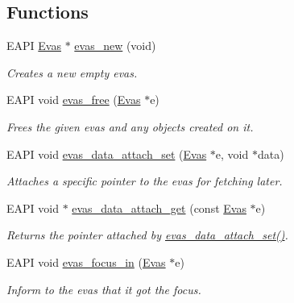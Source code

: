 \subsection*{Functions}
\begin{DoxyCompactItemize}
\item 
EAPI \hyperlink{group__Evas__Canvas_ga5ff87cc4ce6bc43e3b640a6d37f73043}{Evas} $\ast$ \hyperlink{group__Evas__Canvas_ga9280ee6564c889348b142b8bcd723f87}{evas\_\-new} (void)
\begin{DoxyCompactList}\small\item\em Creates a new empty evas. \item\end{DoxyCompactList}\item 
EAPI void \hyperlink{group__Evas__Canvas_ga45ab1883cc0b145bc3af130d3c00a21f}{evas\_\-free} (\hyperlink{group__Evas__Canvas_ga5ff87cc4ce6bc43e3b640a6d37f73043}{Evas} $\ast$e)
\begin{DoxyCompactList}\small\item\em Frees the given evas and any objects created on it. \item\end{DoxyCompactList}\item 
EAPI void \hyperlink{group__Evas__Canvas_gadbf3e81c6db5396d3c6415f3cd34e8c8}{evas\_\-data\_\-attach\_\-set} (\hyperlink{group__Evas__Canvas_ga5ff87cc4ce6bc43e3b640a6d37f73043}{Evas} $\ast$e, void $\ast$data)
\begin{DoxyCompactList}\small\item\em Attaches a specific pointer to the evas for fetching later. \item\end{DoxyCompactList}\item 
EAPI void $\ast$ \hyperlink{group__Evas__Canvas_ga4244b77b68937ab060bc7d8c3bf77fdc}{evas\_\-data\_\-attach\_\-get} (const \hyperlink{group__Evas__Canvas_ga5ff87cc4ce6bc43e3b640a6d37f73043}{Evas} $\ast$e)
\begin{DoxyCompactList}\small\item\em Returns the pointer attached by \hyperlink{group__Evas__Canvas_gadbf3e81c6db5396d3c6415f3cd34e8c8}{evas\_\-data\_\-attach\_\-set()}. \item\end{DoxyCompactList}\item 
EAPI void \hyperlink{group__Evas__Canvas_gad4e5f592d23e74868f1e135c714a1acb}{evas\_\-focus\_\-in} (\hyperlink{group__Evas__Canvas_ga5ff87cc4ce6bc43e3b640a6d37f73043}{Evas} $\ast$e)
\begin{DoxyCompactList}\small\item\em Inform to the evas that it got the focus. \item\end{DoxyCompactList}\item 

\end{DoxyCompactItemize}

